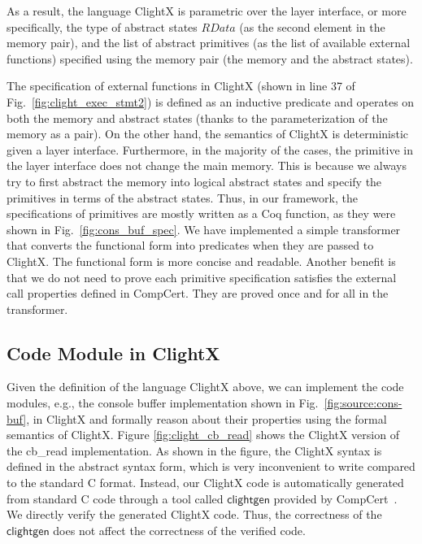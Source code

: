 As a result, the language ClightX is parametric over the layer interface,
or more specifically, the type of abstract states $RData$ (as the second
element in the memory pair), and the list of abstract primitives (as the
list of available external functions) specified using the memory pair
(the memory and the abstract states).

The specification of external functions in ClightX (shown in line 37 of
Fig.~\ref{fig:clight_exec_stmt2}) is defined as an inductive predicate
and operates on both the memory and abstract states (thanks to the parameterization
of the memory as a pair). On the other hand, the semantics of ClightX is
deterministic given a layer interface. Furthermore, in the majority of the
cases, the primitive in the layer interface does not change the main memory.
This is because we always try to first abstract the memory into logical
abstract states and specify the primitives in terms of the abstract
states. Thus, in our framework, the specifications of primitives
are mostly written as a Coq function, as they were shown in Fig.~\ref{fig:cons_buf_spec}.
We have implemented a simple transformer that converts the functional form
into predicates when they are passed to ClightX. The functional form
is more concise and readable. Another benefit is that we do not need to
prove each primitive specification satisfies the external call properties
defined in CompCert. They are proved once and for all in the transformer.

\subsection{Code Module in ClightX}

Given the definition of the language ClightX above,
we can implement the code modules, e.g., the console buffer
implementation shown in Fig.~\ref{fig:source:cons-buf}, in ClightX
and formally reason about their properties using the formal semantics
of ClightX. Figure \ref{fig:clight_cb_read} shows the ClightX version
of the \textsf{cb\_read} implementation.
As shown in the figure, the ClightX syntax is defined
in the abstract syntax form, which is very inconvenient
to write compared to the standard C format. Instead,
our ClightX code is automatically generated from standard C code
through a tool called $\textsf{clightgen}$ provided by CompCert~\cite{compcert}.
We directly verify the generated ClightX code. Thus, the correctness
of the $\textsf{clightgen}$ does not affect the correctness of
the verified code.

